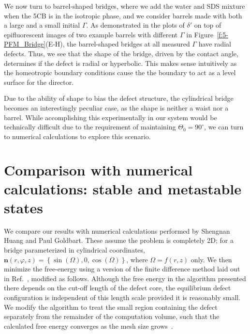 We now turn to barrel-shaped bridges, where we add the water and SDS mixture when the 5CB is in the isotropic phase, and we consider barrels made with both a large and a small initial $\Gamma$.
As demonstrated in the plots of $\delta'$ on top of epifluorescent images of two example barrels with different $\Gamma$ in Figure~\ref{f:5-PFM_Bridge}(E-H), the barrel-shaped bridges at all measured $\Gamma$ have radial defects.
Thus, we see that the shape of the bridge, driven by the contact angle, determines if the defect is radial or hyperbolic.
This makes sense intuitively as the homeotropic boundary conditions cause the the boundary to act as a level surface for the director.

Due to the ability of shape to bias the defect structure, the cylindrical bridge becomes an interestingly peculiar case, as the shape is neither a waist nor a barrel.
While accomplishing this experimentally in our system would be technically difficult due to the requirement of maintaining $\Theta_0 = 90^{\circ}$, we can turn to numerical calculations to explore this scenario.




\section{Comparison with numerical calculations: stable and metastable states}
We compare our results with numerical calculations performed by Shengnan Huang and Paul Goldbart.
These assume the problem is completely 2D; for a bridge parameterized in cylindrical coordinates, $\mathbf{n}(r,\varphi,z) = \left \{ \sin(\Omega), 0, \cos(\Omega)   \right \}$, where $\Omega = f(r,z)$ only.
We then minimize the free-energy using a version of the finite difference method laid out in Ref.~\cite{RN144}, modified as follows.
Although the free energy in the algorithm presented there depends on the cut-off length of the defect core, the equilibrium defect configuration is independent of this length scale provided it is reasonably small.
We modify the algorithm to treat the small region containing the defect separately from the remainder of the computation volume, such that the calculated free energy converges as the mesh size grows~\cite{RN199,RN200,RN201}.

